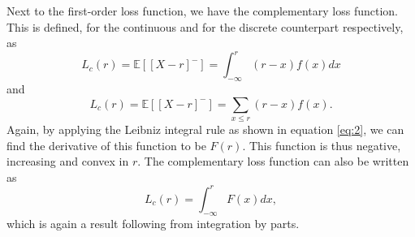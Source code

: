 \documentclass{article}
\begin{document}
\begin{flushleft}
    Next to the first-order loss function, we have the complementary loss function.
    This is defined, for the continuous and for the discrete counterpart respectively, as
    \begin{equation}
        L_c(r) = \mathbb{E}[[X-r]^-] = \int_{-\infty}^r (r-x)f(x)dx
    \end{equation}
    and
    \begin{equation}
        L_c(r) = \mathbb{E}[[X-r]^-] = \sum_{x \le r} (r-x)f(x).
    \end{equation}
    Again, by applying the Leibniz integral rule as shown in equation \ref{eq:2}, we can find the derivative of this function to be $F(r)$.
    This function is thus negative, increasing and convex in $r$.
    The complementary loss function can also be written as
    \begin{equation}
        L_c(r) = \int_{-\infty}^{r} F(x) dx,
    \end{equation}
    which is again a result following from integration by parts.
\end{flushleft}
\end{document}
